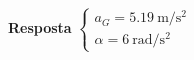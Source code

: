 \textbf{Resposta}
$
\begin{cases}
	a_{G}=\SI{5.19}{\meter/\second^{2}}\\
	\alpha=\SI{6}{\radian/\second^{2}}
\end{cases}
$